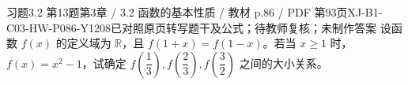 \par\noindent\begin{minipage}{\linewidth}
\begin{bankitem}{习题3.2 第13题}{第3章 / 3.2 函数的基本性质 / 教材 p.86 / PDF 第93页}{XJ-B1-C03-HW-P086-Y1208}{已对照原页转写题干及公式；待教师复核；未制作答案}
设函数 $f(x)$ 的定义域为 $\mathbb R$，且 $f(1+x)=f(1-x)$。若当 $x\ge1$ 时，$f(x)=x^2-1$，试确定 $f\left(\dfrac13\right),f\left(\dfrac23\right),f\left(\dfrac32\right)$ 之间的大小关系。
\end{bankitem}
\end{minipage}\par\medskip
